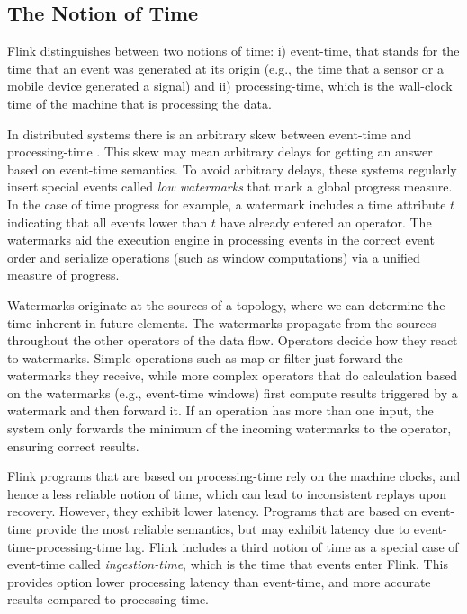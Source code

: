 \documentclass[11pt]{article}
\begin{document}
\vspace{-3mm}
\subsection{The Notion of Time}
\label{sec:streaming-time}
Flink distinguishes between two notions of time: i) event-time, that  stands for the time that an event was generated at its origin (e.g., the time that a sensor or a mobile device generated a signal) and ii) processing-time, which is the wall-clock time of the machine that is processing the data.

In distributed systems there is an arbitrary skew between event-time and processing-time \cite{akidau2015dataflow}. This skew may mean arbitrary delays for getting an answer based on event-time semantics. To avoid arbitrary delays, these systems regularly insert special events called \emph{low watermarks} that mark a global progress measure. In the case of time progress for example, a watermark includes a time attribute $t$ indicating that all events lower than $t$ have already entered an operator. The watermarks aid the execution engine in processing events in the correct event order and serialize operations (such as window computations) via a unified measure of progress.

Watermarks originate at the sources of a topology, where we can determine the time inherent in future elements. The watermarks propagate from the sources throughout the other operators of the data flow. Operators decide how they react to watermarks. Simple operations such as map or filter just forward the watermarks they receive, while more complex operators that do calculation based on the watermarks (e.g., event-time windows) first compute results triggered by a watermark and then forward it. If an operation has more than one input, the system only forwards the minimum of the incoming watermarks to the operator, ensuring correct results.

Flink programs that are based on processing-time rely on the machine clocks, and hence a less reliable notion of time, which can lead to inconsistent replays upon recovery. However, they exhibit lower latency. Programs that are based on event-time provide the most reliable semantics, but may exhibit latency due to event-time-processing-time lag. Flink includes a third notion of time as a special case of event-time called \emph{ingestion-time}, which is the time that events enter Flink. This provides option lower processing latency than event-time, and more accurate results compared to processing-time.
\end{document}
